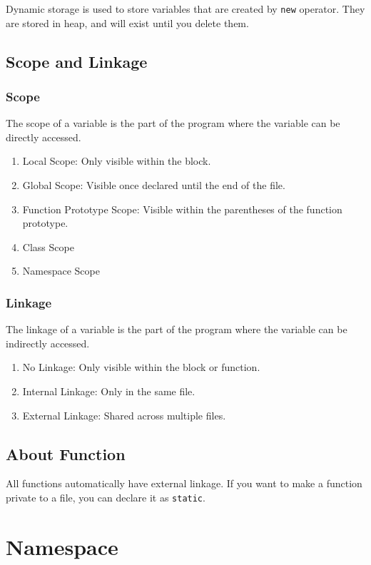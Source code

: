 \documentclass[a4paper,12pt]{article}
\begin{document}
Dynamic storage is used to store variables that are created by \texttt{new} operator.
They are stored in heap, and will exist until you delete them.

\subsection{Scope and Linkage}

\subsubsection{Scope}

The scope of a variable is the part of the program where the variable can be directly accessed.
\begin{enumerate}
	\item Local Scope: Only visible within the block.
	\item Global Scope: Visible once declared until the end of the file.
	\item Function Prototype Scope: Visible within the parentheses of the function prototype.
	\item Class Scope
	\item Namespace Scope
\end{enumerate}

\subsubsection{Linkage}

The linkage of a variable is the part of the program where the variable can be indirectly accessed.
\begin{enumerate}
	\item No Linkage: Only visible within the block or function.
	\item Internal Linkage: Only in the same file.
	\item External Linkage: Shared across multiple files.
\end{enumerate}

\subsection{About Function}

All functions automatically have external linkage.
If you want to make a function private to a file, you can declare it as \texttt{static}.

\section{Namespace}
\end{document}
